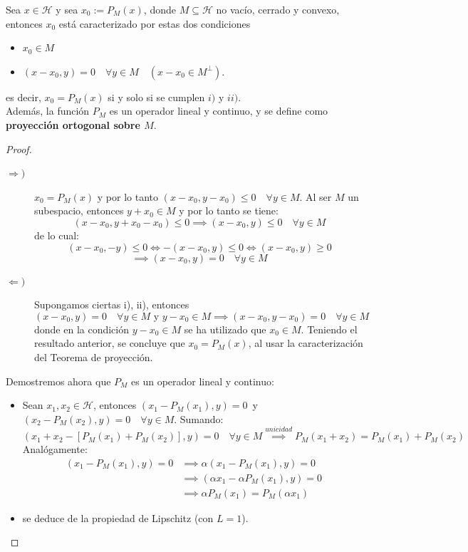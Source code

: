 \begin{prop}
    Sea $x \in \mathcal{H}$ y sea $x_0 := P_{M}(x)$, donde $M\subseteq\mathcal{H}$ no vacío, cerrado y convexo, entonces $x_0$ está caracterizado por estas dos condiciones
    \begin{itemize}
        \item[i)] $x_0 \in M$
        \item[ii)] $(x - x_0, y) = 0 \quad \forall y \in M \quad (x - x_0 \in M^\perp)$.
    \end{itemize}
    es decir, $x_0=P_M(x)$ si y solo si se cumplen $i)$ y $ii)$. \\
    \noindent
    Además, la función $P_M$
    es un operador lineal y continuo, y se define como \textbf{proyección ortogonal sobre $M$}.
\begin{proof}
    \begin{description}
        \item[$\Longrightarrow)$] $x_0 = P_M(x)$ y por lo tanto $(x - x_0, y - x_0) \le 0 \quad \forall y \in M$. Al ser $M$ un subespacio, entonces $y + x_0 \in M$ y por lo tanto se tiene:
        \[ (x - x_0, y + x_0 - x_0) \le 0 \implies (x - x_0, y) \le 0 \quad \forall y \in M \]
        de lo cual:
        \[ (x - x_0, -y) \le 0 \iff -(x - x_0, y) \le 0 \iff (x - x_0, y) \ge 0 \]
        \[ \implies (x - x_0, y) = 0 \quad \forall y \in M \]
        \item[$\Longleftarrow)$] Supongamos ciertas i), ii), entonces
        $$(x - x_0, y) = 0 \quad \forall y \in M \text{ y } y - x_0 \in M \implies (x - x_0, y - x_0) = 0 \quad \forall y \in M$$
        donde en la condición $y - x_0 \in M$ se ha utilizado que $x_0\in M$. Teniendo el resultado anterior, se concluye que $x_0 = P_M(x)$, al usar la caracterización del Teorema de proyección. \\
    \end{description}
    Demostremos ahora que $P_M$ es un operador lineal y continuo:
    \begin{itemize}
        \item {} Sean $x_1, x_2 \in \mathcal{H}$, entonces \mbox{$(x_1 - P_M(x_1), y) = 0$ y $(x_2 - P_M(x_2), y) = 0 \quad \forall y \in M$}. Sumando:
        \[ (x_1 + x_2 - [P_M(x_1) + P_M(x_2)], y) = 0 \quad \forall y \in M \overset{unicidad}{\implies} P_M(x_1 + x_2) = P_M(x_1) + P_M(x_2) \]
        Analógamente:
        \begin{align*}
            (x_1 - P_M(x_1), y) = 0 &\implies \alpha(x_1 - P_M(x_1), y) = 0 \\
            &\implies (\alpha x_1 - \alpha P_M(x_1), y) = 0 \\
            &\implies \alpha P_M(x_1) = P_M(\alpha x_1)
        \end{align*}
        \item {} se deduce de la propiedad de Lipschitz (con $L=1$).
    \end{itemize}
\end{proof}
\end{prop}

